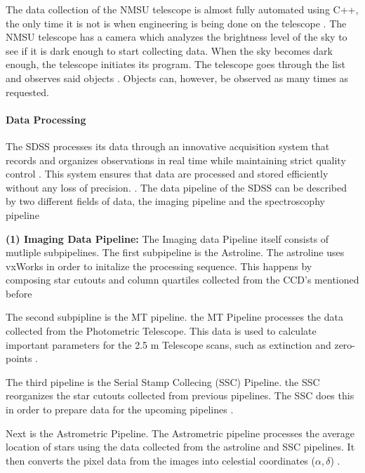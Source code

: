\documentclass[preprint,linenumbers, longauthor]{aastex631}
\begin{document}
The data collection of the NMSU telescope is almost fully automated using C++, the only time it is not is when engineering is being done on the telescope \cite{holtzmanNMSU1Telescope2010}.
The NMSU telescope has a camera which analyzes the brightness level of the sky to see if it is dark enough to start collecting data.
When the sky becomes dark enough, the telescope initiates its program. The telescope goes through the list and observes said objects \cite{holtzmanNMSU1Telescope2010}.
Objects can, however, be observed as many times as requested. 

\paragraph{Data Processing} 
The SDSS processes its data through an innovative acquisition system that records and organizes observations in real time while maintaining strict quality control \cite{gunn25TelescopeSloan2006}. 
This system ensures that data are processed and stored efficiently without any loss of precision. \cite{gunn25TelescopeSloan2006}. 
The data pipeline of the SDSS can be described by two different fields of data, the imaging pipeline and the spectroscophy pipeline

 \textbf{(1) Imaging Data Pipeline:} 
  The Imaging data Pipeline itself consists of mutliple subpipelines. 
  The first subpipeline is the Astroline. The astroline uses vxWorks in order to initalize the processing sequence.
  This happens by composing star cutouts and column quartiles collected from the CCD's mentioned before \cite{luptonSDSSImagingPipelines2001}

  The second subpipline is the MT pipeline. the MT Pipeline processes the data collected from the Photometric Telescope. 
  This data is used to calculate important parameters for the 2.5 m Telescope scans, such as extinction and zero-points \cite{luptonSDSSImagingPipelines2001}.

  The third pipeline is the Serial Stamp Collecing (SSC) Pipeline. the SSC reorganizes the star cutouts collected from previous pipelines.
  The SSC does this in order to prepare data for the upcoming pipelines \cite{luptonSDSSImagingPipelines2001}.

  Next is the Astrometric Pipeline. The Astrometric pipeline processes the average location of stars using the data collected from the astroline and SSC pipelines. 
  It then converts the pixel data from the images into celestial coordinates ($\alpha, \delta$) \cite{luptonSDSSImagingPipelines2001}.
\end{document}

